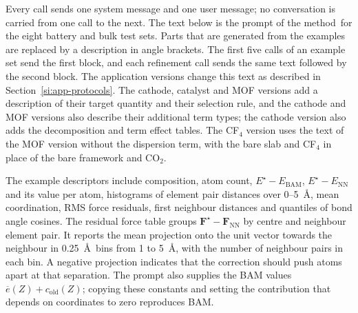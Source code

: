 Every call sends one system message and one user message; no conversation is carried from one call to the next. The text below is the prompt of the method\ifbulk\ for the eight battery and bulk test sets\fi. Parts that are generated from the examples are replaced by a description in angle brackets. The first five calls of an example set send the first block, and each refinement call sends the same text followed by the second block. The application versions change this text as described in Section~\ref{si:app-protocols}. The cathode, catalyst and MOF versions add a description of their target quantity and their selection rule, and the cathode and MOF versions also describe their additional term types; the cathode version also adds the decomposition and term effect tables. The CF$_4$ version uses the text of the MOF version without the dispersion term, with the bare slab and CF$_4$ in place of the bare framework and CO$_2$.

The example descriptors include composition, atom count, $E^\star-E_{\mathrm{BAM}}$, $E^\star-E_{\mathrm{NN}}$ and its value per atom, histograms of element pair distances over 0--5~\AA, mean coordination, RMS force residuals, first neighbour distances and quantiles of bond angle cosines. The residual force table groups $\mathbf F^\star-\mathbf F_{\mathrm{NN}}$ by centre and neighbour element pair. It reports the mean projection onto the unit vector towards the neighbour in 0.25~\AA\ bins from 1 to 5~\AA, with the number of neighbour pairs in each bin. A negative projection indicates that the correction should push atoms apart at that separation. The prompt also supplies the BAM values $\overline e(Z)+c_{\mathrm{old}}(Z)$; copying these constants and setting the contribution that depends on coordinates to zero reproduces BAM.


